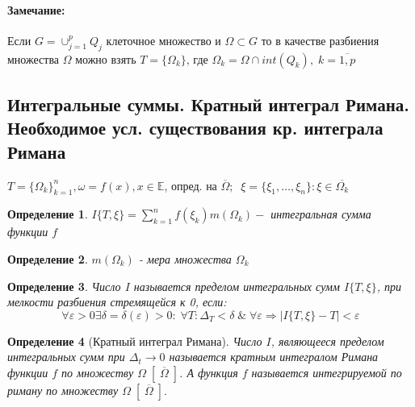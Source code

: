 \documentclass{letnab}
\newtheorem{determenition}{Определение}
\begin{document}
\paragraph{Замечание:}\vspace{-10pt}
	Если $G=\cup^p_{j=1} Q_j $ клеточное множество и $\Omega \subset G $  то в качестве разбиения множества $\Omega $ можно взять $T=\{\Omega_k \} $, где $\Omega_k = \Omega\cap int(Q_k), \; k=\overline{1,p} $

\subsection{Интегральные суммы. Кратный интеграл Римана. \\Необходимое усл. существования кр. интеграла Римана}
$T=\{\Omega_k \}_{k=1}^n,  \omega=f(x), x\in \mathbb{E}$, опред. на $\overline{\Omega}; \;\;\xi = \{\xi_1, \dots, \xi_n \}: \xi \in \overline{\Omega_k} $

\begin{determenition}\vspace{-10pt}
	$I\{T, \xi\} = \sum\limits_{k=1}^n f(\xi_k)m(\Omega_k) - $ интегральная сумма функции $f$
\end{determenition}

\begin{determenition}\vspace{-10pt}
	$m(\Omega_k)$ - мера множества $ \Omega_k$
\end{determenition}


\begin{determenition}\vspace{-10pt}
	Число $I$ называется пределом интегральных сумм $I\{T,\xi \} $, при мелкости разбиения стремящейся к 0, если:\vspace{-10pt}
$$\forall \varepsilon>0 \exists \delta=\delta(\varepsilon)>0: \; \forall T: \Delta_T< \delta\;\&\; \forall \varepsilon \Rightarrow  |I\{T,\xi \} - T|< \varepsilon$$
\end{determenition}

\begin{determenition}[Кратный интеграл Римана]\vspace{-10pt}
	Число $I $, являющееся пределом интегральных сумм при $\Delta_t\rightarrow 0$ называется кратным интегралом Римана функции $f$ по множеству $\Omega \; [\;\overline{\Omega}\;]$. А функция $f$ называется интегрируемой по риману по множеству $\Omega \; [\;\overline{\Omega}\;].$
\end{determenition}\vspace{-20pt}
\vspace{-10pt}
\end{document}

